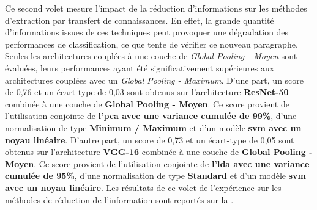 Ce second volet mesure l'impact de la réduction d'informations sur les méthodes d'extraction par transfert de connaissances. En effet, la grande quantité d'informations issues de ces techniques peut provoquer une dégradation des performances de classification, ce que tente de vérifier ce nouveau paragraphe. Seules les architectures couplées à une couche de \textit{Global Pooling - Moyen} sont évaluées, leurs performances ayant été significativement supérieures aux architectures couplées avec un \textit{Global Pooling - Maximum}. D'une part, un score de 0,76 et un écart-type de 0,03 sont obtenus sur l'architecture \textbf{ResNet-50} combinée à une couche de \textbf{Global Pooling - Moyen}. Ce score provient de l'utilisation conjointe de \textbf{l'\gls{pca} avec une variance cumulée de 99\%}, d'une normalisation de type \textbf{Minimum / Maximum} et d'un modèle \textbf{\gls{svm} avec un noyau linéaire}. D'autre part, un score de 0,73 et un écart-type de 0,05 sont obtenus sur l'architecture \textbf{VGG-16} combinée à une couche de \textbf{Global Pooling - Moyen}. Ce score provient de l'utilisation conjointe de \textbf{l'\gls{lda} avec une variance cumulée de 95\%}, d'une normalisation de type \textbf{Standard} et d'un modèle \textbf{\gls{svm} avec un noyau linéaire}. Les résultats de ce volet de l'expérience sur les méthodes de réduction de l'information sont reportés sur la .\par

